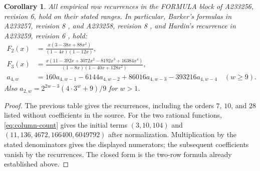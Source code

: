 \documentclass[11pt]{article}
\newtheorem{corollary}[theorem]{Corollary}
\begin{document}
\begin{corollary}\label{cor:rows}
All empirical row recurrences in the FORMULA block of A233256, revision 6,
hold on their stated ranges. In particular, Barker's formulas in A233257,
revision 8 \cite{rowtwo}, and A233258, revision 8 \cite{rowthree},
and Hardin's recurrence in A233259, revision 6 \cite{rowfour}, hold:
\begin{align*}
F_2(x)&=\frac{x(3-38x+88x^2)}{(1-4x)(1-12x)},\\
F_3(x)&=\frac{x(11-392x+3072x^2-8192x^3+16384x^4)}
{(1-8x)(1-40x+128x^2)},\\
a_{4,w}&=160a_{4,w-1}-6144a_{4,w-2}+86016a_{4,w-3}
-393216a_{4,w-4}\quad(w\ge9).
\end{align*}
Also $a_{2,w}=2^{2w-3}(4\cdot3^w+9)/9$ for $w>1$.
\end{corollary}
\begin{proof}
The previous table gives the recurrences, including the orders $7$, $10$,
and $28$ listed without coefficients in the source.
For the two rational functions, \eqref{eq:column-count} gives the initial
terms $(3,10,104)$ and $(11,136,4672,166400,6049792)$ after normalization.
Multiplication by the stated denominators gives the displayed numerators;
the subsequent coefficients vanish by the recurrences.
The closed form is the two-row formula already established above.
\end{proof}
\end{document}
